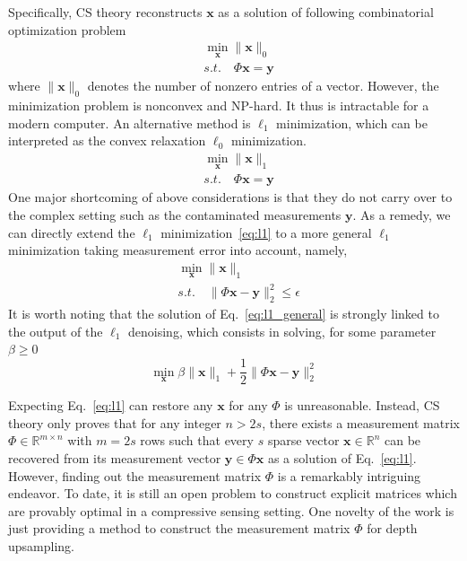 \documentclass[preprint,10pt,5p,times,twocolumn]{elsarticle}
\begin{document}
Specifically, CS theory reconstructs $\mathbf{x}$ as a solution of following combinatorial optimization problem
%
\begin{equation}
\begin{split}
& \min_{\mathbf{x}} \| \mathbf{x} \|_0 \\
& s.t. \quad \Phi \mathbf{x} = \mathbf{y}
\end{split}
\end{equation}
%
where $\| \mathbf{x} \|_0$ denotes the number of nonzero entries of a vector. However, the minimization problem is nonconvex and NP-hard. It thus is intractable for a modern computer. An alternative method is $\ell_1$ minimization, which can be interpreted as the convex relaxation $\ell_0$ minimization.
%
\begin{equation}
\begin{split}
& \min_\mathbf{x} \| \mathbf{x} \|_1 \\
& s.t. \quad \Phi \mathbf{x} = \mathbf{y}
\end{split}
\label{eq:l1}
\end{equation}
%
One major shortcoming of above considerations is that they do not carry over to the complex setting such as the contaminated measurements $\mathbf{y}$. As a remedy, we can directly extend the $\ell_1$ minimization~\eqref{eq:l1} to a more general $\ell_1$ minimization taking measurement error into account, namely,
%
\begin{equation}
\begin{split}
& \min_\mathbf{x} \| \mathbf{x} \|_1 \\
& s.t. \quad \| \Phi \mathbf{x} - \mathbf{y} \|_2^2 \leq \epsilon
 \end{split}
\label{eq:l1_general}
\end{equation}
%
It is worth noting that the solution of Eq.~\eqref{eq:l1_general} is strongly linked to the output of the $\ell_1$ denoising, which consists in
solving, for some parameter $\beta \geq 0$
%
\begin{equation}
\min_\mathbf{x} \beta \| \mathbf{x} \|_1 + \frac{1}{2} \| \Phi \mathbf{x} - \mathbf{y} \|_2^2
\end{equation}
%

Expecting Eq.~\eqref{eq:l1} can restore any $\mathbf{x}$ for any $\Phi$ is unreasonable. Instead, CS theory only proves that for any integer $n > 2s$, there exists a measurement matrix $\Phi \in \mathbb{R}^{m \times n}$ with $m = 2s$ rows such that every $s$ sparse vector $\mathbf{x} \in \mathbb{R}^{n}$ can be recovered from its measurement vector $\mathbf{y} \in \Phi \mathbf{x} $ as a solution of Eq.~\eqref{eq:l1}. However, finding out the measurement matrix $\Phi$ is a remarkably
intriguing endeavor. To date, it is still an open problem to construct explicit matrices
which are provably optimal in a compressive sensing setting. One novelty of the work is just providing a method to construct the measurement matrix $\Phi$ for depth upsampling.
\end{document}
